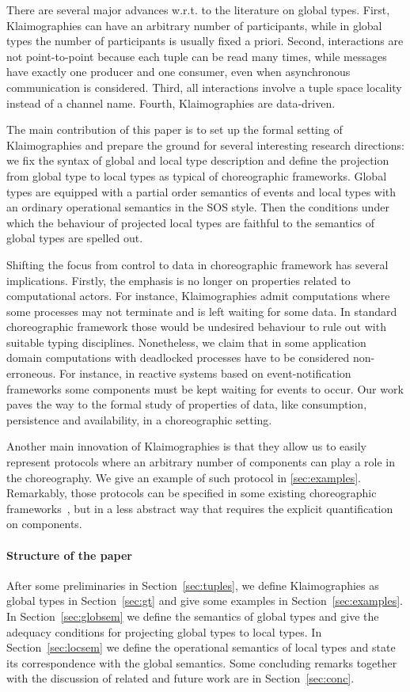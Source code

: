There are several major advances w.r.t. to the literature on global types.
First, Klaimographies can have an arbitrary number of participants, while in global types the number of participants is usually fixed a priori.
Second, interactions are not point-to-point because each tuple can be read many times, while messages have exactly one producer and one consumer, even when asynchronous communication is considered.
Third, all interactions involve a tuple space locality instead of a channel name.
Fourth, Klaimographies are data-driven.

The main contribution of this paper is to set up the formal setting of Klaimographies and prepare the ground for several interesting research directions: we fix the syntax of global and local type description and define the projection from global type to local types as typical of choreographic frameworks.
Global types are equipped with a partial order semantics of events and local types with an ordinary operational semantics in the SOS style. Then the conditions under which the behaviour of projected local types are faithful to the semantics of global types are spelled out. 

Shifting the focus from control to data in choreographic framework has
several implications.
%
Firstly, the emphasis is no longer on properties related to
computational actors.
%
For instance, Klaimographies admit computations where some processes
may not terminate and is left waiting for some data.
%
In standard choreographic framework those would be undesired behaviour
to rule out with suitable typing disciplines.
%
Nonetheless, we claim that in some application domain computations with
deadlocked processes have to be considered non-erroneous.
%
For instance, in reactive systems based on event-notification
frameworks some  components must be kept waiting for
events to occur.
%
Our work paves the way to the formal study of properties of data, like consumption, persistence and availability, in a choreographic setting.

Another main innovation of Klaimographies is that they allow us to easily
represent protocols where an arbitrary number of components can
play a role in the choreography.
%
We give an example of such protocol in \cref{sec:examples}.
%
Remarkably, those protocols can be specified in some existing
choreographic frameworks~\cite{ydbh10,chjny19}, but in a less abstract way
that requires the explicit quantification on components.

\paragraph{Structure of the paper}
After some preliminaries in Section~\ref{sec:tuples}, we define Klaimographies as global types in Section~\ref{sec:gt} and give some examples in Section~\ref{sec:examples}.
In Section~\ref{sec:globsem} we define the semantics of global types and give the adequacy conditions for projecting global types to local types.
In Section~\ref{sec:locsem} we define the operational semantics of local types and state its correspondence with the global semantics.
Some concluding remarks together with the discussion of related and future work are in Section~\ref{sec:conc}.


